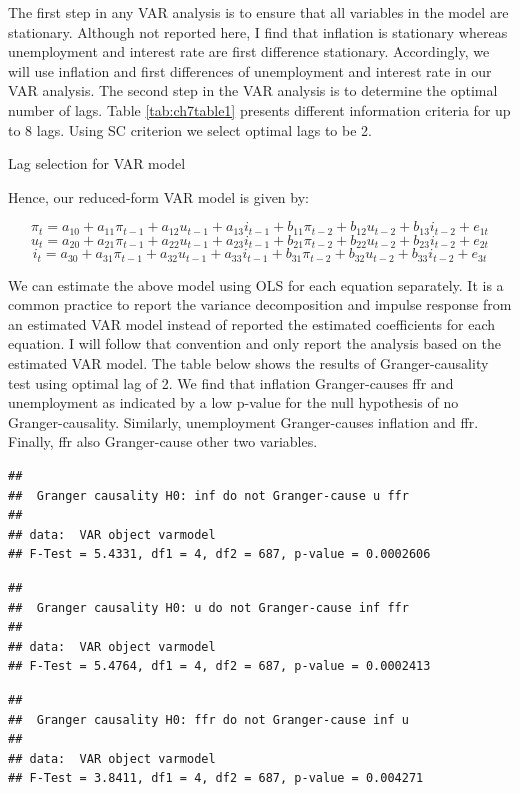 \documentclass[]{book}
\theoremstyle{definition}
\theoremstyle{definition}
\theoremstyle{definition}
\theoremstyle{remark}
\begin{document}
The first step in any VAR analysis is to ensure that all variables in the model are stationary. Although not reported here, I find that inflation is stationary whereas unemployment and interest rate are first difference stationary. Accordingly, we will use inflation and first differences of unemployment and interest rate in our VAR analysis. The second step in the VAR analysis is to determine the optimal number of lags. Table \ref{tab:ch7table1} presents different information criteria for up to 8 lags. Using SC criterion we select optimal lags to be 2.

\label{tab:ch7table1} Lag selection for VAR model

Hence, our reduced-form VAR model is given by:

\[ \pi_t = a_{10} + a_{11} \pi_{t-1} + a_{12} u_{t-1} + a_{13} i_{t-1} + b_{11} \pi_{t-2} + b_{12} u_{t-2} + b_{13} i_{t-2} + e_{1t}\]
\[ u_t = a_{20} + a_{21} \pi_{t-1} + a_{22} u_{t-1} + a_{23} i_{t-1}+ b_{21} \pi_{t-2} + b_{22} u_{t-2} + b_{23} i_{t-2} + e_{2t}\]
\[ i_t = a_{30} + a_{31} \pi_{t-1} + a_{32} u_{t-1} + a_{33} i_{t-1}+ b_{31} \pi_{t-2} + b_{32} u_{t-2} + b_{33} i_{t-2}+ e_{3t}\]

We can estimate the above model using OLS for each equation separately. It is a common practice to report the variance decomposition and impulse response from an estimated VAR model instead of reported the estimated coefficients for each equation. I will follow that convention and only report the analysis based on the estimated VAR model. The table below shows the results of Granger-causality test using optimal lag of 2. We find that inflation Granger-causes ffr and unemployment as indicated by a low p-value for the null hypothesis of no Granger-causality. Similarly, unemployment Granger-causes inflation and ffr. Finally, ffr also Granger-cause other two variables.

\begin{verbatim}
## 
##  Granger causality H0: inf do not Granger-cause u ffr
## 
## data:  VAR object varmodel
## F-Test = 5.4331, df1 = 4, df2 = 687, p-value = 0.0002606
\end{verbatim}

\begin{verbatim}
## 
##  Granger causality H0: u do not Granger-cause inf ffr
## 
## data:  VAR object varmodel
## F-Test = 5.4764, df1 = 4, df2 = 687, p-value = 0.0002413
\end{verbatim}

\begin{verbatim}
## 
##  Granger causality H0: ffr do not Granger-cause inf u
## 
## data:  VAR object varmodel
## F-Test = 3.8411, df1 = 4, df2 = 687, p-value = 0.004271
\end{verbatim}
\end{document}
